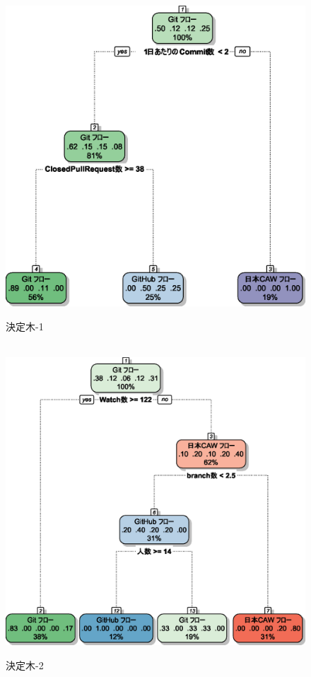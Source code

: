 \begin{figure}[H]
\centering　
\includegraphics[width=13cm]{half1.eps}
\caption{決定木-1}\label{half決定木1}
\end{figure}

\begin{figure}[H]
\centering　
\includegraphics[width=13cm]{half2.eps}
\caption{決定木-2}\label{half決定木2}
\end{figure}

